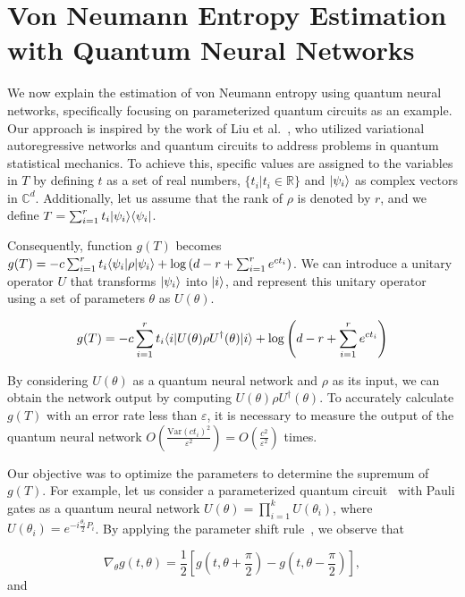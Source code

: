 \documentclass[aps,groupedaddress,superscriptaddress,amssymb,amsmath,amsbsy,amsfonts,twocolumn,pra]{revtex4}
\begin{document}
\section{Von Neumann Entropy Estimation with Quantum Neural Networks} \label{sec:MAIN}
We now explain the estimation of von Neumann entropy using quantum neural networks, specifically focusing on parameterized quantum circuits as an example. Our approach is inspired by the work of Liu et al.~\cite{LMZW21}, who utilized variational autoregressive networks and quantum circuits to address problems in quantum statistical mechanics. To achieve this, specific values are assigned to the variables in $T$ by defining $t$ as a set of real numbers, $\{t_i | t_i \in \mathbb{R}\}$ and $|\psi_i\rangle$ as complex vectors in $\mathbb{C}^d$. Additionally, let us assume that the rank of $\rho$ is denoted by $r$, and we define $T = \sum^r_{i=1} t_i |\psi_i\rangle\langle\psi_i|$.

Consequently, function $g(T)$ becomes $g(T) = -c\sum^r_{i=1} t_i \langle\psi_i|\rho|\psi_i\rangle + \log\left(d-r+\sum^r_{i=1} e^{ct_i}\right)$. We can introduce a unitary operator $U$ that transforms $|\psi_i\rangle$ into $|i\rangle$, and represent this unitary operator using a set of parameters $\theta$ as $U(\theta)$.

\begin{equation}
g(T) = -c\sum^r_{i=1} t_i \langle i|U(\theta)\rho U^{\dagger}(\theta)|i\rangle + \log\left(d-r+\sum^r_{i=1} e^{ct_i}\right)
\end{equation}

By considering $U(\theta)$ as a quantum neural network and $\rho$ as its input, we can obtain the network output by computing $U(\theta)\rho U^{\dagger}(\theta)$. To accurately calculate $g(T)$ with an error rate less than $\varepsilon$, it is necessary to measure the output of the quantum neural network $O\left(\frac{\text{Var}({ct_i})^2}{\varepsilon^{2}}\right) = O\left(\frac{c^2}{\varepsilon^{2}}\right)$ times.

Our objective was to optimize the parameters to determine the supremum of $g(T)$. For example, let us consider a parameterized quantum circuit~\cite{BLSF19} with Pauli gates as a quantum neural network $U(\theta) = \prod^k_{i=1} U(\theta_i)$, where $U(\theta_i) = e^{-i\frac{\theta_i}{2}P_i}$. By applying the parameter shift rule~\cite{MNKF18}, we observe that

\begin{equation}
\nabla_{\theta}g(t, \theta) = \frac{1}{2}\left[g\left(t, \theta+\frac{\pi}{2}\right)-g\left(t, \theta-\frac{\pi}{2}\right)\right],
\end{equation}
and
\end{document}
